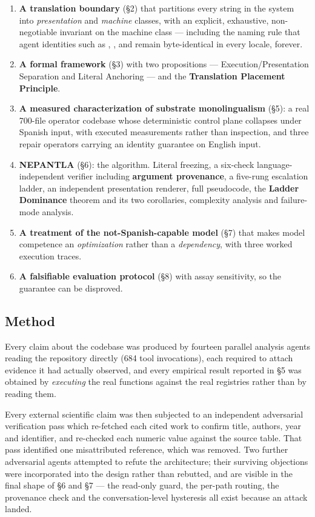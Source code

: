 \begin{enumerate}
  \item \textbf{A translation boundary} (\S2) that partitions every string in the system into \emph{presentation} and \emph{machine} classes, with an explicit, exhaustive, non-negotiable invariant on the machine class --- including the naming rule that agent identities such as , ,  and  remain byte-identical in every locale, forever.
  \item \textbf{A formal framework} (\S3) with two propositions --- Execution/Presentation Separation and Literal Anchoring --- and the \textbf{Translation Placement Principle}.
  \item \textbf{A measured characterization of substrate monolingualism} (\S5): a real 700-file operator codebase whose deterministic control plane collapses under Spanish input, with executed measurements rather than inspection, and three repair operators carrying an identity guarantee on English input.
  \item \textbf{NEPANTLA} (\S6): the algorithm. Literal freezing, a six-check language-independent verifier including \textbf{argument provenance}, a five-rung escalation ladder, an independent presentation renderer, full pseudocode, the \textbf{Ladder Dominance} theorem and its two corollaries, complexity analysis and failure-mode analysis.
  \item \textbf{A treatment of the not-Spanish-capable model} (\S7) that makes model competence an \emph{optimization} rather than a \emph{dependency}, with three worked execution traces.
  \item \textbf{A falsifiable evaluation protocol} (\S8) with assay sensitivity, so the guarantee can be disproved.
\end{enumerate}

\subsection{Method}
\label{sec:method}

Every claim about the codebase was produced by fourteen parallel analysis agents reading the repository directly (684 tool invocations), each required to attach  evidence it had actually observed, and every empirical result reported in \S5 was obtained by \emph{executing} the real functions against the real registries rather than by reading them.

Every external scientific claim was then subjected to an independent adversarial verification pass which re-fetched each cited work to confirm title, authors, year and identifier, and re-checked each numeric value against the source table. That pass identified one misattributed reference, which was removed. Two further adversarial agents attempted to refute the architecture; their surviving objections were incorporated into the design rather than rebutted, and are visible in the final shape of \S6 and \S7 --- the read-only guard, the per-path routing, the provenance check and the conversation-level hysteresis all exist because an attack landed.
